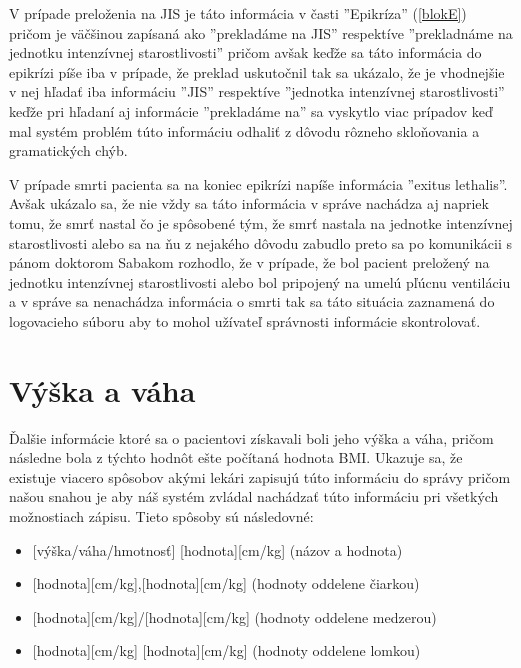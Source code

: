 V prípade preloženia na JIS je táto informácia v časti ''Epikríza'' (\ref{blokE}) pričom je väčšinou zapísaná ako ''prekladáme na JIS'' respektíve ''prekladnáme na jednotku intenzívnej starostlivosti'' pričom avšak keďže sa táto informácia do epikrízi píše iba v prípade, že preklad uskutočnil tak sa ukázalo, že je vhodnejšie v nej hľadať iba informáciu ''JIS'' respektíve ''jednotka intenzívnej starostlivosti'' keďže pri hľadaní aj informácie ''prekladáme na'' sa vyskytlo viac prípadov keď mal systém problém túto informáciu odhaliť z dôvodu rôzneho skloňovania a gramatických chýb.

V prípade smrti pacienta sa na koniec epikrízi napíše informácia ''exitus lethalis''. Avšak ukázalo sa, že nie vždy sa táto informácia v správe nachádza aj napriek tomu, že smrť nastal čo je spôsobené tým, že smrť nastala na jednotke intenzívnej starostlivosti alebo sa na ňu z nejakého dôvodu zabudlo preto sa po komunikácii s pánom doktorom Sabakom rozhodlo, že v prípade, že bol pacient preložený na jednotku intenzívnej starostlivosti alebo bol pripojený na umelú pľúcnu ventiláciu a v správe sa nenachádza informácia o smrti tak sa táto situácia zaznamená do logovacieho súboru aby to mohol užívateľ správnosti informácie skontrolovať.

\section{Výška a váha}

Ďalšie informácie ktoré sa o pacientovi získavali boli jeho výška a váha, pričom následne bola z týchto hodnôt ešte počítaná hodnota BMI. Ukazuje sa, že existuje viacero spôsobov akými lekári zapisujú túto informáciu do správy pričom našou snahou je aby náš systém zvládal nachádzať túto informáciu pri všetkých možnostiach zápisu. Tieto spôsoby sú následovné:

\begin{itemize}
	\item {[výška/váha/hmotnosť]} {[hodnota]}{[cm/kg]} (názov a hodnota)
	\item {[hodnota]}{[cm/kg]},{[hodnota]}{[cm/kg]} (hodnoty oddelene čiarkou)
	\item {[hodnota]}{[cm/kg]}/{[hodnota]}{[cm/kg]} (hodnoty oddelene medzerou)
	\item {[hodnota]}{[cm/kg]} {[hodnota]}{[cm/kg]} (hodnoty oddelene lomkou)
\end{itemize}   


